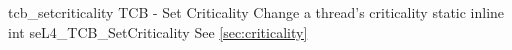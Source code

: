 %
%
%
%

\apidoc
{tcb_setcriticality}
{TCB - Set Criticality}
{Change a thread's criticality}
{static inline int seL4\_TCB\_SetCriticality }
{
}
{\errorenumdesc}
{See \autoref{sec:criticality}}
